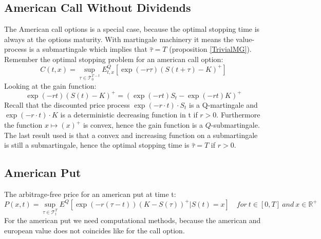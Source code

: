 \subsection{American Call Without Dividends}
The American call options is a special case, because the optimal stopping time is always at the options maturity. With martingale machinery it means the value-process is a submartingale which implies that $\hat{\tau}=T$ (proposition \ref{TrivialMG}). Remember the optimal stopping problem for an american call option:
$$C(t,x)=\sup_{\tau \in \mathcal{T}_0^{T-t}} E_{t,x}^Q[\exp(-r\tau) (S(t+\tau)-K)^+]$$
Looking at the gain function:
\begin{equation*}
\exp(-r t) (S(t)-K)^+ = (\exp(-r t) S_{t} - \exp(-r t) K)^+
\end{equation*}
Recall that the discounted price process $\exp(-r\cdot t) \cdot S_t$ is a Q-martingale and $\exp(-r\cdot t) \cdot K$ is a deterministic decreasing function in t if $r>0$. Furthermore the function $x \mapsto (x)^+$ is convex, hence the gain function is a $Q$-submartingale. The last result used is that a convex and increasing function on a submartingale is still a submartingale, hence the optimal stopping time is $\hat{\tau}=T$ if $r>0$.

\subsection{American Put}\label{americanPut}
The arbitrage-free price for an american put at time t:
\begin{equation}\label{AmericanPutPrice}
P(x,t)=\sup_{\tau \in \mathcal{T}_t^T} E^Q[\exp(-r(\tau-t)) (K-S(\tau))^+|S(t)=x] \quad for \ t\in [0,T] \ and \ x\in\mathbb{R}^+
\end{equation}
For the american put we need computational methods, because the american and european value does not coincides like for the call option.

